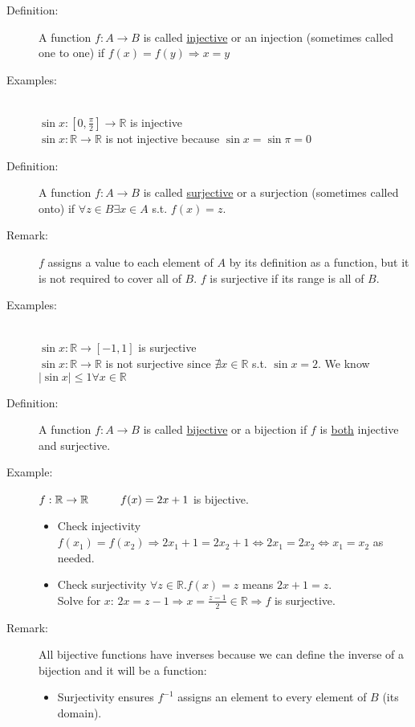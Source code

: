 \documentclass[10pt]{article}
\begin{document}
	\begin{description}
		\item[Definition:] A function $f: A \rightarrow B$ is called \underline{injective} or an injection (sometimes called one to one) if $f(x)=f(y) \Rightarrow x=y$
		\item[Examples:] ~\\
		$\sin{x}: [0, \frac{\pi}{2}] \rightarrow \mathbb{R}$ is injective \\
		$\sin{x}: \mathbb{R} \rightarrow \mathbb{R}$ is not injective because $\sin{x} = \sin{\pi} = 0$
		\item[Definition:] A function $f: A \rightarrow B$ is called \underline{surjective} or a surjection (sometimes called onto) if $\forall z \in B \exists x \in A$ s.t. $f(x) = z$.
		\item[Remark:] $f$ assigns a value to each element of $A$ by its definition as a function, but it is not required to cover all of $B$. $f$ is surjective if its range is all of $B$.
		\item[Examples:] ~\\
		$\sin{x}: \mathbb{R} \rightarrow [-1, 1]$ is surjective \\
		$\sin{x}: \mathbb{R} \rightarrow \mathbb{R}$ is not surjective since $\nexists x \in \mathbb{R}$ s.t. $\sin{x} = 2$. We know $| \sin{x} | \leq 1 \forall x \in \mathbb{R}$
		\item[Definition:] A function $f:A \rightarrow B$ is called \underline{bijective} or a bijection if $f$ is \underline{both} injective and surjective.
		\item[Example:] $f: \mathbb{R} \rightarrow \mathbb{R} \hspace{10mm} f(x) = 2x+1$ is bijective.
		\begin{itemize}
			\item Check injectivity $f(x_1) = f(x_2) \Rightarrow 2x_1 + 1 = 2x_2 + 1 \Leftrightarrow 2x_1 = 2x_2 \Leftrightarrow x_1 = x_2$ as needed.
			\item Check surjectivity $\forall z \in \mathbb{R}. f(x) = z$ means $2x+1=z$. \\
			Solve for $x$: $2x=z-1 \Rightarrow x = \frac{z-1}{2} \in \mathbb{R} \Rightarrow f$ is surjective.
		\end{itemize}
		\item[Remark:] All bijective functions have inverses because we can define the inverse of a bijection and it will be a function:
		\begin{itemize}
			\item Surjectivity ensures $f^{-1}$ assigns an element to every element of $B$ (its domain).

\end{itemize}
\end{description}
\end{document}
